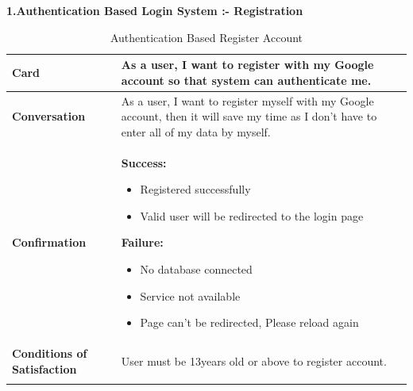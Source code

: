\textbf{1.Authentication Based Login System :- Registration}
\begin{center}
\setlength{\tabcolsep}{0.8cm}
\renewcommand{\arraystretch}{1.2}
        \centering
        \begin{longtable}{|m{70pt}|p{9cm}|}
            \hline
                \textbf{Card} &
                    As a user, I want to register with my Google account so that system can authenticate me.\\
            \hline
                \textbf{Conversation} &
                    As a user, I want to register myself with my Google account, then it will save my time as I don't have to enter all of my data by myself.\\
            \hline
                \textbf{Confirmation} & 
                    \textbf{Success:}
                            \begin{itemize}
                            \item  Registered successfully
                            \item  Valid user will be redirected to the login page
                            \end{itemize}
                    \textbf{Failure:}       
                            \begin{itemize}
                            \item  No database connected
                            \item  Service not available
                            \item  Page can't be redirected, Please reload again
                            \end{itemize}\\
            \hline
                \textbf{Conditions of Satisfaction} &  
                        User must be 13years old or above to register account. \\
            \hline
        \caption{Authentication Based Register Account}
        \label{tab:my_label}
        \end{longtable}
\end{center}

